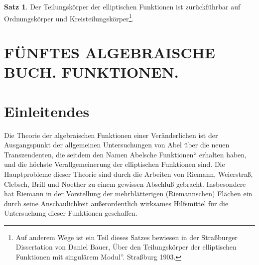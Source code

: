 \documentclass[12pt,a4paper]{article}
\theoremstyle{definition}
\newtheorem{satz}{Satz}[section]
\begin{document}
\begin{satz}
Der Teilungskörper der elliptischen Funktionen ist zurückführbar auf Ordnungskörper und Kreisteilungskörper\footnote{Auf anderem Wege ist ein Teil dieses Satzes bewiesen in der Straßburger Dissertation von Daniel Bauer, \glqq Über den Teilungskörper der elliptischen Funktionen mit singulärem Modul''. Straßburg 1903.}.
\end{satz}

\newpage
\section*{FÜNFTES ALGEBRAISCHE BUCH. FUNKTIONEN.}

\setcounter{section}{169}

\section{Einleitendes}


Die Theorie der algebraischen Funktionen einer Veränderlichen ist der Ausgangspunkt der allgemeinen Untersuchungen von Abel über die neuen Transzendenten, die seitdem den Namen \glqq Abelsche Funktionen`` erhalten haben, und die höchste Verallgemeinerung der elliptischen Funktionen sind. Die Hauptprobleme dieser Theorie sind durch die Arbeiten von Riemann, Weierstraß, Clebsch, Brill und Noether zu einem gewissen Abschluß gebracht. Insbesondere hat Riemann in der Vorstellung der mehrblätterigen (Riemannschen) Flächen ein durch seine Anschaulichkeit außerordentlich wirksames Hilfsmittel für die Untersuchung dieser Funktionen geschaffen.
\end{document}
